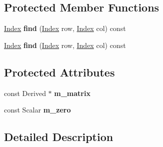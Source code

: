 \subsection*{Protected Member Functions}
\begin{DoxyCompactItemize}
\item 
\mbox{\label{struct_eigen_1_1internal_1_1evaluator_3_01_sparse_compressed_base_3_01_derived_01_4_01_4_a4c68f588a99a46a47ee5b3f75f3a5bf8}} 
\hyperlink{namespace_eigen_a62e77e0933482dafde8fe197d9a2cfde}{Index} {\bfseries find} (\hyperlink{namespace_eigen_a62e77e0933482dafde8fe197d9a2cfde}{Index} row, \hyperlink{namespace_eigen_a62e77e0933482dafde8fe197d9a2cfde}{Index} col) const
\item 
\mbox{\label{struct_eigen_1_1internal_1_1evaluator_3_01_sparse_compressed_base_3_01_derived_01_4_01_4_a4c68f588a99a46a47ee5b3f75f3a5bf8}} 
\hyperlink{namespace_eigen_a62e77e0933482dafde8fe197d9a2cfde}{Index} {\bfseries find} (\hyperlink{namespace_eigen_a62e77e0933482dafde8fe197d9a2cfde}{Index} row, \hyperlink{namespace_eigen_a62e77e0933482dafde8fe197d9a2cfde}{Index} col) const
\end{DoxyCompactItemize}
\subsection*{Protected Attributes}
\begin{DoxyCompactItemize}
\item 
\mbox{\label{struct_eigen_1_1internal_1_1evaluator_3_01_sparse_compressed_base_3_01_derived_01_4_01_4_aec75b2ea9c8e8a20ecddac79215d3b18}} 
const Derived $\ast$ {\bfseries m\+\_\+matrix}
\item 
\mbox{\label{struct_eigen_1_1internal_1_1evaluator_3_01_sparse_compressed_base_3_01_derived_01_4_01_4_aae5203679f27d57f812976ee83afc227}} 
const Scalar {\bfseries m\+\_\+zero}
\end{DoxyCompactItemize}


\subsection{Detailed Description}

